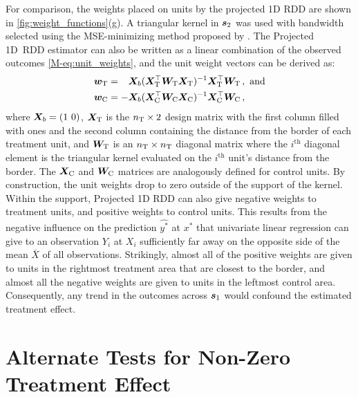 \documentclass[letter,12pt]{article}
\begin{document}
        For comparison, the weights placed on units by the projected 1D RDD are shown in \autoref{fig:weight_functions}(g).
A triangular kernel in \(\bm{s}_2\) was used with bandwidth selected using the MSE-minimizing method proposed by \cite{imbens2012optimal}.
The Projected 1D~RDD estimator can also be written as a linear combination of the observed outcomes \autoref*{M-eq:unit_weights}, and the unit weight vectors can be derived as:
\begin{equation}
\begin{split}
\bm{w}_{\mathrm{T}} &= \hphantom{-} \bm{X}_b (\bm{X}_{\mathrm{T}}^{\top} \bm{W}_{\mathrm{T}} \bm{X}_{\mathrm{T}})^{-1} \bm{X}_{\mathrm{T}}^{\top} \bm{W}_{\mathrm{T}} \,, 
\text{ and}
\\
\bm{w}_{\mathrm{C}} &= - \bm{X}_b (\bm{X}_{\mathrm{C}}^{\top} \bm{W}_{\mathrm{C}} \bm{X}_{\mathrm{C}})^{-1} \bm{X}_{\mathrm{C}}^{\top} \bm{W}_{\mathrm{C}} \,, 
\end{split}
\label{eq:unit_weights_llr}
\end{equation}
where \(\bm{X}_b = \left\lparen1~0\right\rparen\), \(\bm{X}_{\mathrm{T}}\) is the \(n_{\mathrm{T}} \times 2\) design matrix with the first column filled with ones and the second column containing the distance from the border of each treatment unit, and \(\bm{W}_{\mathrm{T}}\) is an \(n_{\mathrm{T}} \times n_{\mathrm{T}}\) diagonal matrix where the \(i^\mathrm{th}\) diagonal element is the triangular kernel evaluated on the \(i^\mathrm{th}\) unit's distance from the border.
The \(\bm{X}_{\mathrm{C}}\) and \(\bm{W}_{\mathrm{C}}\) matrices are analogously defined for control units.
By construction, the unit weights drop to zero outside of the support of the kernel.
Within the support, Projected 1D RDD can also give negative weights to treatment units, and positive weights to control units.
This results from the negative influence on the prediction \(\widehat{y^*}\) at \(x^*\) that univariate linear regression can give to an observation \(Y_i\) at \(X_i\) sufficiently far away on the opposite side of the mean \(\overline{X}\) of all observations.
Strikingly, almost all of the positive weights are given to units in the rightmost treatment area that are closest to the border, and almost all the negative weights are given to units in the leftmost control area.
Consequently, any trend in the outcomes across \(\bm{s}_1\) would confound the estimated treatment effect.

\section{Alternate Tests for Non-Zero Treatment Effect}
\label{sec:alternate_tests}
\end{document}
